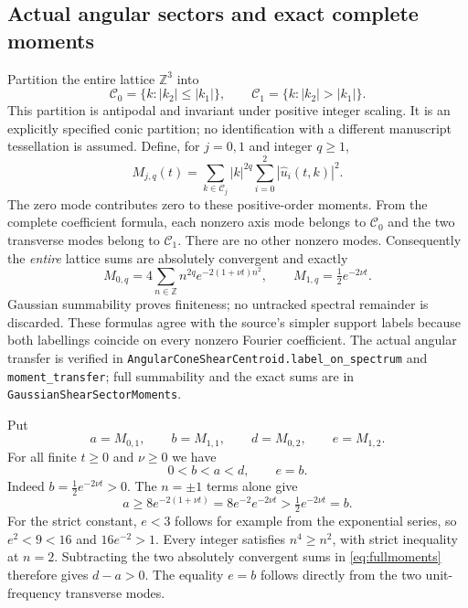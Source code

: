 \documentclass[11pt]{article}
\newcommand{\code}[1]{{\small\nolinkurl{#1}}}
\begin{document}
\begingroup\raggedright
\subsection{Actual angular sectors and exact complete moments}
Partition the entire lattice $\mathbb Z^3$ into
\[
 \mathcal C_0=\{k:|k_2|\leq|k_1|\},\qquad
 \mathcal C_1=\{k:|k_2|>|k_1|\}.
\]
This partition is antipodal and invariant under positive integer scaling.
It is an explicitly specified conic partition; no identification with a
different manuscript tessellation is assumed. Define, for $j=0,1$ and
integer $q\geq1$,
\[
 M_{j,q}(t)=\sum_{k\in\mathcal C_j}|k|^{2q}
                                  \sum_{i=0}^2|\widehat u_i(t,k)|^2.
\]
The zero mode contributes zero to these positive-order moments. From the
complete coefficient formula, each nonzero axis mode belongs to
$\mathcal C_0$ and the two transverse modes belong to $\mathcal C_1$.
There are no other nonzero modes. Consequently the \emph{entire} lattice
sums are absolutely convergent and exactly
\begin{equation}\label{eq:fullmoments}
 M_{0,q}=4\sum_{n\in\mathbb Z}n^{2q}e^{-2(1+\nu t)n^2},\qquad
 M_{1,q}=\tfrac12e^{-2\nu t}.
\end{equation}
Gaussian summability proves finiteness; no untracked spectral remainder is
discarded. These formulas agree with the source's simpler support labels
because both labellings coincide on every nonzero Fourier coefficient.
The actual angular transfer is verified in
\code{AngularConeShearCentroid.label_on_spectrum} and
\code{moment_transfer}; full summability and the exact sums are in
\code{GaussianShearSectorMoments}.
\par\endgroup

Put
\[
 a=M_{0,1},\qquad b=M_{1,1},\qquad d=M_{0,2},\qquad e=M_{1,2}.
\]
For all finite $t\geq0$ and $\nu\geq0$ we have
\begin{equation}\label{eq:orders}
 0<b<a<d,\qquad e=b.
\end{equation}
Indeed $b=\frac12 e^{-2\nu t}>0$. The $n=\pm1$ terms alone give
\[
 a\geq8e^{-2(1+\nu t)}
           =8e^{-2}e^{-2\nu t}>\tfrac12e^{-2\nu t}=b.
\]
For the strict constant, $e<3$ follows for example from the exponential
series, so $e^2<9<16$ and $16e^{-2}>1$.
Every integer satisfies $n^4\geq n^2$, with strict inequality at $n=2$.
Subtracting the two absolutely convergent sums in \eqref{eq:fullmoments}
therefore gives $d-a>0$. The equality $e=b$ follows directly from the
two unit-frequency transverse modes.
\end{document}
